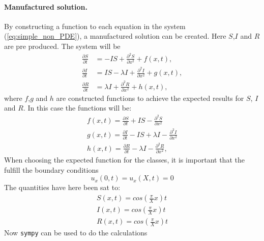 \documentclass[%
twoside,                 %
final,                   %
10pt]{article}
\begin{document}
\paragraph{Manufactured solution.}
By constructing a function to each equation in the system (\ref{eq:simple_non_PDE}), a manufactured solution can be created. Here $S$,$I$ and $R$ are pre produced. The system will be
\begin{equation} \label{eq:simple_non_PDE2}
	\begin{aligned}
	\frac{\partial S}{\partial t} &= -IS + \frac{\partial^2 S}{\partial x^2}+f(x,t),\\
	\frac{\partial I}{\partial t} &= IS- \lambda I + \frac{\partial^2 I}{\partial x^2}+g(x,t),\\
	\frac{\partial R}{\partial t} &= \lambda I + \frac{\partial^2 R}{\partial x^2}+h(x,t),
	\end{aligned}
\end{equation}
where $f$,$g$ and $h$ are constructed functions to achieve the expected results for $S$, $I$ and $R$. In this case the functions will be:
\begin{equation}
	\begin{aligned}
	f(x,t) = \frac{\partial S}{\partial t} + IS - \frac{\partial^2 S}{\partial x^2}\\
	g(x,t) = \frac{\partial I}{\partial t} - IS + \lambda I - \frac{\partial^2 I}{\partial x^2}\\
	h(x,t) = \frac{\partial R}{\partial t} -\lambda I - \frac{\partial^2 R}{\partial x^2},
	\end{aligned}
\end{equation}
When choosing the expected function for the classes, it is important that the fulfill the boundary conditions
\begin{equation}
    u_x(0,t) = u_x(X,t) = 0
\end{equation}
The quantities have here been sat to:
\begin{equation}
	\begin{aligned}
    S(x,t) = cos(\frac{\pi}{X}x)t\\
    I(x,t) = cos(\frac{\pi}{X}x)t\\
    R(x,t) = cos(\frac{\pi}{X}x)t
	\end{aligned}
\end{equation}
Now \Verb!sympy! can be used to do the calculations
\end{document}
